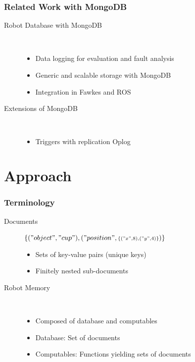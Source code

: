 \begin{frame}
  \frametitle{Related Work with MongoDB}
  \begin{description}
  \item[Robot Database with MongoDB~\cite{RoboDB}]%
                \hfill \\
    \begin{itemize}
    \item Data logging for evaluation and fault analysis
    \item Generic and scalable storage with MongoDB
    \item Integration in Fawkes and ROS
    \end{itemize}
\bigskip
  \item[Extensions of  MongoDB]%
                \hfill \\
    \begin{itemize}
    \item Triggers with replication Oplog~\cite{mongodb-trigger}
    \end{itemize}
  \end{description}
\end{frame}


\section{Approach}
\begin{frame}[plain]
  \tableofcontents[currentsection]
\end{frame}
\addtocounter{framenumber}{-1}

\begin{frame}
  \frametitle{Terminology}
  \begin{description}
  \item[Documents] \hfill {\small $\{("object","cup"),("position",{\scriptstyle\{("x",8),("y",4)\}})\}$}\\
    \begin{itemize}
    \item Sets of key-value pairs (unique keys)
    \item Finitely nested sub-documents
    \end{itemize}
\bigskip
  \item[Robot Memory] \hfill \\
    \begin{itemize}
    \item Composed of database and computables
    \item Database: Set of documents
    \item Computables: Functions yielding sets of documents
    \end{itemize}
  \end{description}  
\end{frame}

